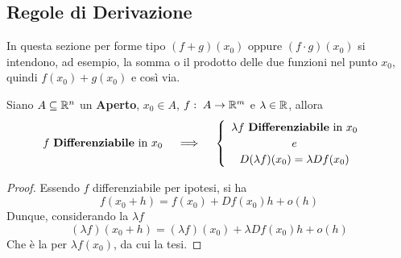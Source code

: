 \subsection{Regole di Derivazione}\label{sect:regole_deriv}
\begin{note}
	In questa sezione per forme tipo $(f + g)(x_0)$ oppure $(f \cdot g)(x_0)$ si intendono, ad esempio, la somma o il prodotto delle due funzioni nel punto $x_0$, quindi $f(x_0) + g(x_0)$ e così via.
\end{note}
\begin{proposition}
	Siano $A \subseteq \mathbb{R}^n$ un \textbf{Aperto}, $x_0 \in A$, $f:\; A \to \mathbb{R}^m$ e $\lambda \in \mathbb{R}$, allora
	\[
		f \text{ \textbf{Differenziabile} in } x_0
		\quad \implies \quad
		\begin{cases}
			\begin{array}{c}
				\lambda f \text{ \textbf{Differenziabile} in } x_0\\
				e\\
				D(\lambda f)(x_0) = \lambda Df(x_0)
			\end{array}
		\end{cases}
	\]
	\begin{proof}
		Essendo $f$ differenziabile per ipotesi, si ha
		\[f(x_0 + h) = f(x_0) + Df(x_0)h + o(h)\]
		Dunque, considerando la $\lambda f$
		\[(\lambda f)(x_0 + h) = (\lambda f)(x_0) + \lambda Df(x_0)h + o(h)\]
		Che è la  per $\lambda f(x_0)$, da cui la tesi.
	\end{proof}
\end{proposition}
